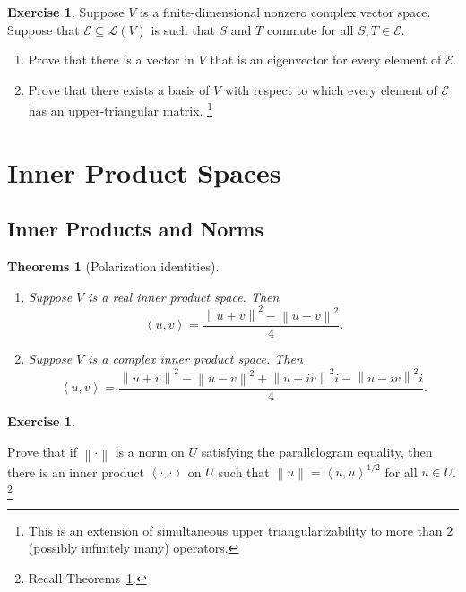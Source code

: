 \documentclass[nofonts,colorlinks]{tufte-handout}
\theoremstyle{plain} %
\newtheorem{thms}[thm]{Theorems}
\theoremstyle{definition}
\newtheorem{exer}[thm]{Exercise}
\theoremstyle{remark}
\newcommand{\norm}[1]{\mathopen{}\left\lVert#1\right\rVert}
\newcommand{\inp}[2]{\mathopen{}\left\langle#1,#2\right\rangle}
\newcommand{\R}{\mathbb{R}}
\renewcommand{\L}{\mathcal{L}}
\newcommand{\E}{\mathcal{E}}
\begin{document}
\begin{exer}
	Suppose $V$ is a finite-dimensional nonzero complex vector space. Suppose that $\E\subseteq\L(V)$ is such that $S$ and $T$ commute for all $S,T\in\E$.
	\begin{enumerate}
		\item Prove that there is a vector in $V$ that is an eigenvector for every element of $\E$.
		\item Prove that there exists a basis of $V$ with respect to which every element of $\E$ has an upper-triangular matrix.%
		\footnote{This is an extension of simultaneous upper triangularizability to more than $2$ (possibly infinitely many) operators.}
	\end{enumerate}
\end{exer}


\section{Inner Product Spaces}
\subsection{Inner Products and Norms}
\begin{thms}[Polarization identities]
	\begin{enumerate}
		\item Suppose $V$ is a real inner product space. Then
		\[\inp{u}{v}=\frac{\norm{u+v}^2-\norm{u-v}^2}{4}.\]
		\item Suppose $V$ is a complex inner product space. Then
		\[\inp{u}{v}=\frac{\norm{u+v}^2-\norm{u-v}^2+\norm{u+iv}^2i-\norm{u-iv}^2i}{4}.\]
	\end{enumerate}
	\label{thm: polarization identities}
\end{thms}

\begin{exer}\label{exer: condition for a norm-induced inner product}

	Prove that if $\norm{\cdot}$ is a norm on $U$ satisfying the parallelogram equality, then there is an inner product $\inp{\cdot}{\cdot}$ on $U$ such that $\norm{u}=\inp{u}{u}^{1/2}$ for all $u\in U$.%
	\footnote{Recall Theorems~\ref{thm: polarization identities}.}
\end{exer}

\end{document}
